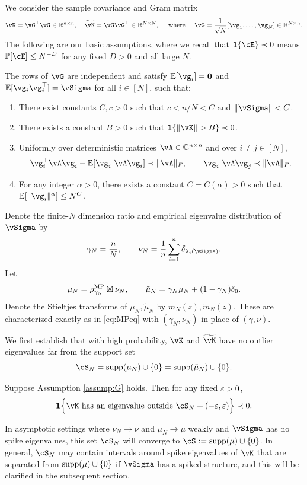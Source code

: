 We consider the sample covariance and Gram matrix
\[\vK=\vG^\top\vG \in \R^{n \times n}, \quad
\widetilde \vK=\vG\vG^\top \in \R^{N \times N}, \quad \text{ where } \quad
\vG=\frac{1}{\sqrt{N}}[\vg_1,\ldots,\vg_N] \in \R^{N \times n}.\]
The following are our basic assumptions, where we
recall that $\bI\{\cE\} \prec 0$ means $\P[\cE] \leq N^{-D}$ for any fixed $D>0$
and all large $N$.
\begin{assumption}\label{assump:G}
\phantom{}
The rows of $\vG$ are independent and satisfy
$\E[\vg_i]=\mathbf{0}$ and $\E[\vg_i\vg_i^\top]=\vSigma$ for all $i\in[N]$,
such that:
\begin{enumerate}[label=(\alph*)]
\item There exist constants $C,c>0$ such that $c<n/N<C$ and
$\|\vSigma\|<C$.
\item There exists a constant $B>0$ such that
$\bI\{\|\vK\|>B\} \prec 0$.
\item Uniformly over deterministic matrices $\vA \in \C^{n \times n}$ and over
$i \neq j \in [N]$,
\[\vg_i^\top \vA \vg_i - \E[\vg_i^\top \vA \vg_i]
\prec \|\vA\|_F, \qquad \vg_i^\top \vA \vg_j \prec \|\vA\|_F.\]
\item For any integer $\alpha>0$, there exists a constant $C=C(\alpha)>0$
such that $\E[\|\vg_i\|^\alpha] \leq N^C$.
\end{enumerate}
\end{assumption}

Denote the finite-$N$
dimension ratio and empirical eigenvalue distribution of $\vSigma$ by
\begin{equation}\label{eq:gammanuN}
\gamma_N=\frac{n}{N}, \qquad \nu_N=\frac{1}{n}\sum_{i=1}^n
\delta_{\lambda_i(\vSigma)}.
\end{equation}
Let
\[\mu_N=\rho_{\gamma_N}^{\textnormal{MP}} \boxtimes \nu_N, 
\qquad \tilde \mu_N=\gamma_N\mu_N+(1-\gamma_N)\delta_0.\]
Denote the Stieltjes transforms of $\mu_N,\tilde \mu_N$ by
$m_N(z),\tilde m_N(z)$. These are characterized exactly as in \eqref{eq:MPeq}
with $(\gamma_N,\nu_N)$ in place of $(\gamma,\nu)$.

We first establish that with high probability,
$\vK$ and $\widetilde \vK$ have no outlier eigenvalues far from the support set
\begin{equation}\label{eq:support}
\cS_N=\supp{\mu_N} \cup \{0\}=\supp{\tilde \mu_N} \cup \{0\}.
\end{equation}
\begin{theorem}\label{thm:no_outlier}
Suppose Assumption \ref{assump:G} holds. Then for any fixed $\varepsilon>0$,
\begin{align*}
\bI\Big\{\vK \text{ has an eigenvalue outside }
\cS_N+(-\eps,\eps)\Big\} \prec 0.
\end{align*}
\end{theorem}
In asymptotic settings where $\nu_N \to \nu$ and $\mu_N \to \mu$ weakly and
$\vSigma$ has no spike eigenvalues, this set $\cS_N$ will converge to
$\cS:=\supp{\mu} \cup \{0\}$. In general, $\cS_N$ may contain intervals around
spike eigenvalues of $\vK$ that are separated from $\mathrm{supp}({\mu}) \cup \{0\}$
if $\vSigma$ has a spiked structure, and this will be clarified in the
subsequent section.

